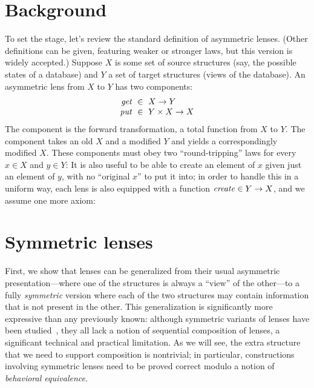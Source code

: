 \section{Background}
\newif \iftext  \texttrue
\newif \iffull  \fulltrue
\newif \ifdraft \draftfalse
\newif \ifdelta \deltafalse
\newif \iflater \laterfalse  %
\newif \iftikz  \tikztrue
To set the stage, let's review the standard definition of
asymmetric lenses.  
%
(Other definitions can be given, featuring weaker or stronger laws, but this
version is widely accepted.)
%
Suppose $X$ is some set of source structures (say, the possible states of a
database) and $Y$ a set of target structures (views of the database).
%
An asymmetric lens from $X$ to $Y$ has two components:
\[ 
\begin{array}{r@{\ \;}c@{\ \;}l}
\GET &\in& X \arrow Y\\
\PUT &\in& Y \times X \arrow X
\end{array}
\]
The \GET{} component is the forward transformation, a total function from
$X$ to $Y$.  The \PUT{} component takes an old $X$ and a modified $Y$ and
yields a correspondingly modified $X$.  These components
must obey two ``round-tripping'' laws for every $x \in X$ and $y
\in Y$:
%
%
It is also useful to be able to create an element of $x$ given just an
element of $y$, with no ``original $x$'' to put it into; in order to handle
this in a 
uniform way, each lens is also equipped with a
function $\mathit{create}\in Y\rightarrow X$, and we assume one more axiom:

\section{Symmetric lenses}
First, we show that lenses can be generalized from their usual asymmetric
presentation---where one of the structures is always a ``view'' of the
other---to a 
fully {\em symmetric} version where each of the two structures may 
contain information that is not present in the other.
This generalization is significantly more expressive than any previously
known: although symmetric variants of lenses have been
studied~\cite{Meertens98,stevens2008tat,DBLP:conf/models/Diskin08}, they
all lack a notion of sequential composition of lenses, a significant
technical and practical limitation.
%
As we will see, the extra structure that we need to support composition is
nontrivial; in particular, constructions involving
symmetric lenses need to be proved correct modulo a notion of {\em behavioral
  equivalence}.

